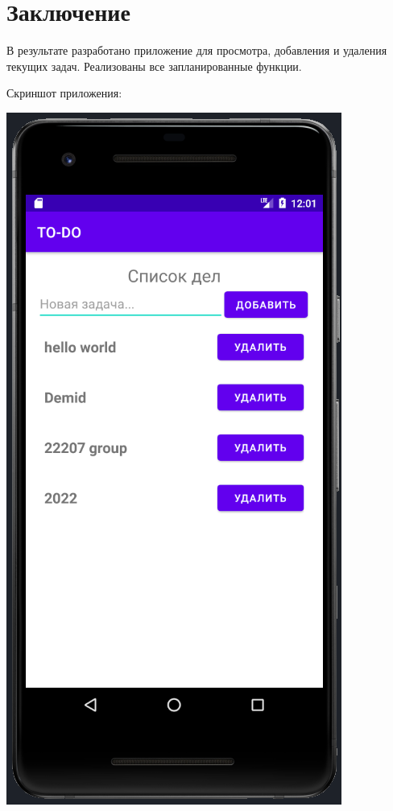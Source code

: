 \documentclass[a4paper,12pt]{article}
\begin{document}

\newpage
\section*{Заключение}
В результате разработано приложение для просмотра, добавления и удаления текущих задач. Реализованы все запланированные функции.

Скриншот приложения:
\begin{center}
    \includegraphics[scale=0.8]{images/todoapp.png}
\end{center}
\end{document}
